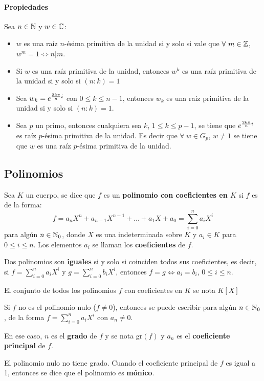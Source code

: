\paragraph{Propiedades} Sea $n\in\mathbb{N}$ y $w\in\mathbb{C}$:
\begin{itemize}
    \item $w$ es una raíz $n$-ésima primitiva de la unidad si y solo si vale que $\forall~m\in\mathbb{Z}$, $w^m = 1 \iff n|m$.
    \item Si $w$ es una raíz primitiva de la unidad, entonces $w^k$ es una raíz primitiva de la unidad si y solo si $(n:k)=1$
    \item Sea $w_k =e^{\frac{2k\pi}{n} i}$ con $0\leq k\leq n-1$, entonces $w_k$ es una raíz primitiva de la unidad si y solo si $(n:k)=1$.
    \item Sea $p$ un primo, entonces cualquiera sea $k$, $1\leq k\leq p-1$, se tiene que $e^{\frac{2k\pi}{n} i}$ es raíz $p$-ésima primitiva de la unidad. Es decir que $\forall~w\in G_p$, $w\neq 1$ se tiene que $w$ es una raíz $p$-ésima primitiva de la unidad.
\end{itemize}
\subsection{Polinomios}
Sea $K$ un cuerpo, se dice que $f$ es un \textbf{polinomio con coeficientes en $K$} si $f$ es de la forma:
\begin{equation*}
    f = a_nX^n + a_{n-1}X^{n-1} + \dots + a_1X + a_0 = \sum_{i=0}^{n}a_iX^i
\end{equation*}
para algún $n\in\mathbb{N}_0$, donde $X$ es una indeterminada sobre $K$ y $a_i\in K$ para $0\leq i\leq n$. Los elementos $a_i$ se llaman los \textbf{coeficientes} de $f$.

Dos polinomios son \textbf{iguales} si y solo si coinciden todos sus coeficientes, es decir, si $f=\sum_{i=0}^{n}a_iX^i$ y $g=\sum_{i=0}^{n}b_iX^i$, entonces $f = g \iff a_i = b_i$, $0\leq i \leq n$.

El conjunto de todos los polinomios $f$ con coeficientes en $K$ se nota $K\left[ X \right] $

Si $f$ no es el polinomio nulo ($f\neq 0$), entonces se puede escribir para algún $n\in\mathbb{N}_0$, de la forma $f=\sum_{i=0}^{n}a_iX^i$ con $a_n\neq 0$.

En ese caso, $n$ es el \textbf{grado} de $f$ y se nota gr$(f)$ y $a_n$ es el \textbf{coeficiente principal} de $f$.

El polinomio nulo no tiene grado. Cuando el coeficiente principal de $f$ es igual a 1, entonces se dice que el polinomio es \textbf{mónico}.

